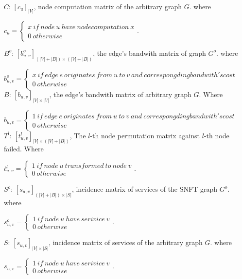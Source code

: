 $C$: $[c_{u}]_{|V|}$, node computation matrix of the arbitrary graph $G$. where

${c_{u}}=\left\{ \begin{array}{l}x\ if\ node\ u\ have\ node computation\ x\\
0\ otherwise
\end{array} \right.$.

$B^o$: $[b^o_{u,v}]_{(|V|+|B|)\times (|V|+|B|)}$, the edge's bandwith matrix of graph $G^o$. where

${b^o_{u,v}}=\left\{ \begin{array}{l}
x\ if\ edge\ e\ originates\ from\ u\ to\ v\ and\ correspongding bandwith's cost\\
0\ otherwise
\end{array} \right.$ \\

$B$: $[b_{u,v}]_{|V|\times |V|}$, the edge's bandwith matrix of arbitrary graph $G$. Where

${b_{u,v}}=\left\{ \begin{array}{l}
1\ if\ edge\ e\ originates\ from\ u\ to\ v\ and\ correspongding bandwith's cost\\
0\ otherwise
\end{array} \right.$ \\

$T^{l}$: $[t^l_{u,v}]_{|V|\times (|V|+|B|)}$, The $l$-th node permutation matrix against $l$-th node failed. Where

${t^l_{u,v}}=\left\{ \begin{array}{l}1\ if\ node\ u\ transformed\ to\ node\ v\\
0\ otherwise
\end{array} \right.$.

$S^o$: $[s_{u,v}]_{(|V|+|B|)\times |S|}$, incidence matrix of services of the SNFT graph $G^o$. where

${s^o_{u,v}}=\left\{ \begin{array}{l}1\ if\ node\ u\ have\ serivice\ v\\
0\ otherwise
\end{array} \right.$.

$S$: $[s_{u,v}]_{|V|\times |S|}$, incidence matrix of services of the arbitrary graph $G$. where

${s_{u,v}}=\left\{ \begin{array}{l}1\ if\ node\ u\ have\ serivice\ v\\
0\ otherwise
\end{array} \right.$.

